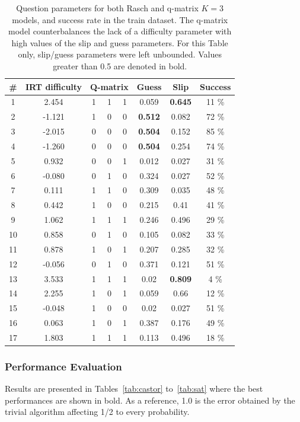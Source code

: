 \documentclass{edm_template}
\begin{document}
\begin{table}
\small\centering\begin{tabular}{c|c|ccccc|c}
\# & IRT difficulty & 	\multicolumn{3}{c}{Q-matrix} & Guess & Slip & Success\\
\hline
1 & 2.454 & 	1 & 1 & 1 & 0.059 & \textbf{0.645} & 11 \% \\
2 & -1.121 & 	1 & 0 & 0 & \textbf{0.512} & 0.082 & 72 \% \\
3 & -2.015 & 	0 & 0 & 0 & \textbf{0.504} & 0.152 & 85 \% \\
4 & -1.260 & 	0 & 0 & 0 & \textbf{0.504} & 0.254 & 74 \% \\
5 & 0.932 & 	0 & 0 & 1 & 0.012 & 0.027 & 31 \% \\
6 & -0.080 & 	0 & 1 & 0 & 0.324 & 0.027 & 52 \% \\
7 & 0.111 & 	1 & 1 & 0 & 0.309 & 0.035 & 48 \% \\
8 & 0.442 & 	1 & 0 & 0 & 0.215 & 0.41 & 41 \% \\
9 & 1.062 & 	1 & 1 & 1 & 0.246 & 0.496 & 29 \% \\
10 & 0.858 & 	0 & 1 & 0 & 0.105 & 0.082 & 33 \% \\
11 & 0.878 & 	1 & 0 & 1 & 0.207 & 0.285 & 32 \% \\
12 & -0.056 & 	0 & 1 & 0 & 0.371 & 0.121 & 51 \% \\
13 & 3.533 & 	1 & 1 & 1 & 0.02 & \textbf{0.809} & 4 \% \\
14 & 2.255 & 	1 & 0 & 1 & 0.059 & 0.66 & 12 \% \\
15 & -0.048 & 	1 & 0 & 0 & 0.02 & 0.027 & 51 \% \\
16 & 0.063 & 	1 & 0 & 1 & 0.387 & 0.176 & 49 \% \\
17 & 1.803 & 	1 & 1 & 1 & 0.113 & 0.496 & 18 \%
\end{tabular}
\caption{Question parameters for both Rasch and q-matrix $K = 3$ models, and success rate in the train dataset. The q-matrix model counterbalances the lack of a difficulty parameter with high values of the slip and guess parameters. For this Table only, slip/guess parameters were left unbounded. Values greater than 0.5 are denoted in bold.}
\label{tab:example}
\end{table}

\subsubsection{Performance Evaluation}

Results are presented in Tables~\ref{tab:castor} to~\ref{tab:sat} where the best performances are shown in bold. As a reference, 1.0 is the error obtained by the trivial algorithm affecting 1/2 to every probability. %
\end{document}
